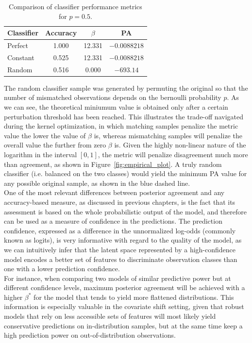 \begin{table}[H]
    \centering
    \begin{tabular}{lccc}
    Classifier & Accuracy & $\beta$ & PA \\
    \midrule
    Perfect   & 1.000     & 12.331  & $-0.0088218$ \\
    Constant  & 0.525     & 12.331  & $-0.0088218$ \\
    Random    & 0.516     & 0.000   & $-693.14$    \\
    \bottomrule
    \end{tabular}
    \caption{Comparison of classifier performance metrics for $p = 0.5$.}
    \label{tab:empirical_table}
\end{table}

The random classifier sample was generated by permuting the original so 
that the number of mismatched observations depends on the bernoulli probability $p$. 
As we can see, the theoretical miniumum value  is obtained only after
a certain perturbation threshold has been reached. This illustrates the trade-off
navigated during the kernel optimization, in which matching samples penalize the 
metric value the lower the value of $\beta$ is, whereas mismatching samples will
penalize the overall value the further from zero $\beta$ is. Given the highly non-linear
nature of the logarithm in the interval $[0,1]$, the metric will penalize 
disagreement much more than agreement, as shown in Figure~\ref{fig:empirical_plot}.
A truly random classifier (i.e. balanced on the two classes) would yield the minimum
PA value for any possible original sample, as shown in the blue dashed line.\\

One of the most relevant differences between posterior agreement and any accuracy-based
measure, as discussed in previous chapters, is the fact that its assessment is based on
the whole probabilistic output of the model, and therefore can be used as a measure of
confidence in the predictions. The prediction confidence, expressed as a difference in 
the unnormalized log-odds (commonly known as logits), is very informative with regard 
to the quality of the model, as we can intuitively infer that the latent 
space represented by a high-confidence model encodes a better set of features 
to discriminate observation classes than one with a lower prediction confidence. \\

For instance, when comparing two models of similar predictive power but at different 
confidence levels, maximum posterior agreement will be achieved with a higher 
$\beta^{*}$ for the model that tends to yield more flattened distributions. This
information is especially valuable in the covariate shift setting, given that robust
models that rely on less accessible sets of features will most likely yield conservative
predictions on in-distribution samples, but at the same time keep a high prediction
power on out-of-distribution observations. \\

